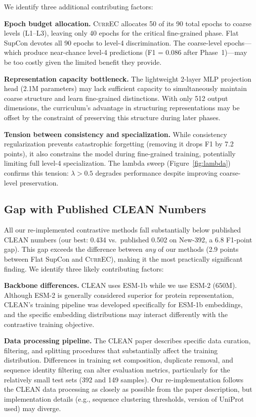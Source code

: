 \documentclass{article}
\newcommand{\currec}{\textsc{CurrEC}}
\begin{document}
We identify three additional contributing factors:

\textbf{Epoch budget allocation.} \currec{} allocates 50 of its 90 total epochs to coarse levels (L1--L3), leaving only 40 epochs for the critical fine-grained phase. Flat SupCon devotes all 90 epochs to level-4 discrimination. The coarse-level epochs---which produce near-chance level-4 predictions (F1 = 0.086 after Phase~1)---may be too costly given the limited benefit they provide.

\textbf{Representation capacity bottleneck.} The lightweight 2-layer MLP projection head (2.1M parameters) may lack sufficient capacity to simultaneously maintain coarse structure and learn fine-grained distinctions. With only 512 output dimensions, the curriculum's advantage in structuring representations may be offset by the constraint of preserving this structure during later phases.

\textbf{Tension between consistency and specialization.} While consistency regularization prevents catastrophic forgetting (removing it drops F1 by 7.2 points), it also constrains the model during fine-grained training, potentially limiting full level-4 specialization. The lambda sweep (Figure~\ref{fig:lambda}) confirms this tension: $\lambda > 0.5$ degrades performance despite improving coarse-level preservation.

\subsection{Gap with Published CLEAN Numbers}\label{sec:clean_gap}

All our re-implemented contrastive methods fall substantially below published CLEAN numbers (our best: 0.434 vs.\ published 0.502 on New-392, a 6.8 F1-point gap). This gap exceeds the difference between \emph{any} of our methods (2.9 points between Flat SupCon and \currec{}), making it the most practically significant finding. We identify three likely contributing factors:

\textbf{Backbone differences.} CLEAN uses ESM-1b while we use ESM-2 (650M). Although ESM-2 is generally considered superior for protein representation, CLEAN's training pipeline was developed specifically for ESM-1b embeddings, and the specific embedding distributions may interact differently with the contrastive training objective.

\textbf{Data processing pipeline.} The CLEAN paper describes specific data curation, filtering, and splitting procedures that substantially affect the training distribution. Differences in training set composition, duplicate removal, and sequence identity filtering can alter evaluation metrics, particularly for the relatively small test sets (392 and 149 samples). Our re-implementation follows the CLEAN data processing as closely as possible from the paper description, but implementation details (e.g., sequence clustering thresholds, version of UniProt used) may diverge.
\end{document}
